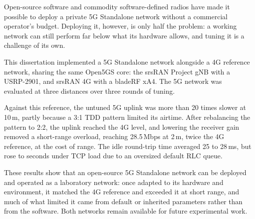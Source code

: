 
%

Open-source software and commodity software-defined radios have made it possible to deploy a private 5G Standalone network without a commercial operator's budget. Deploying it, however, is only half the problem: a working network can still perform far below what its hardware allows, and tuning it is a challenge of its own.

This dissertation implemented a 5G Standalone network alongside a 4G reference network, sharing the same Open5GS core: the srsRAN Project gNB with a USRP-2901, and srsRAN 4G with a bladeRF xA4. The 5G network was evaluated at three distances over three rounds of tuning.

Against this reference, the untuned 5G uplink was more than 20 times slower at 10\,m, partly because a 3:1 TDD pattern limited its airtime. After rebalancing the pattern to 2:2, the uplink reached the 4G level, and lowering the receiver gain removed a short-range overload, reaching 28.5\,Mbps at 2\,m, twice the 4G reference, at the cost of range. The idle round-trip time averaged 25 to 28\,ms, but rose to seconds under TCP load due to an oversized default RLC queue.

These results show that an open-source 5G Standalone network can be deployed and operated as a laboratory network: once adapted to its hardware and environment, it matched the 4G reference and exceeded it at short range, and much of what limited it came from default or inherited parameters rather than from the software. Both networks remain available for future experimental work.
